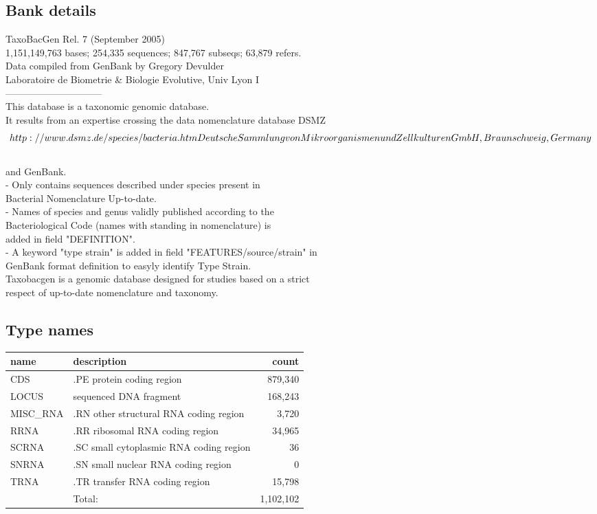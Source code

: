 \documentclass{article}
\begin{document}
\begin{Schunk}
\subsection{Bank details}
TaxoBacGen Rel. 7 (September 2005)\\
1,151,149,763 bases; 254,335 sequences; 847,767 subseqs; 63,879 refers.\\
Data compiled from GenBank by Gregory Devulder\\
Laboratoire de Biometrie \& Biologie Evolutive, Univ Lyon I\\
------------------------------\\
This database is a taxonomic genomic database.\\
It results from an expertise crossing the data nomenclature database DSMZ\\
\[http://www.dsmz.de/species/bacteria.htm Deutsche Sammlung von\\
Mikroorganismen und Zellkulturen GmbH, Braunschweig, Germany\]\\
and GenBank.\\
- Only contains sequences described under species present in\\
Bacterial Nomenclature Up-to-date.\\
- Names of species and genus validly published according to the\\
Bacteriological Code (names with standing in nomenclature) is\\
added in field "DEFINITION".\\
- A keyword "type strain" is added in field "FEATURES/source/strain" in\\
GenBank format definition to easyly identify Type Strain.\\
Taxobacgen is a genomic database designed for studies based on a strict\\
respect of up-to-date nomenclature and taxonomy.

\subsection{Type names}
\noindent\begin{tabular}{llr}
\hline \hline
name & description & count \\
\hline
CDS  &  .PE protein coding region  &  879,340 \\
LOCUS  &  sequenced DNA fragment  &  168,243 \\
MISC\_RNA  &  .RN other structural RNA coding region  &  3,720 \\
RRNA  &  .RR ribosomal RNA coding region  &  34,965 \\
SCRNA  &  .SC small cytoplasmic RNA coding region  &  36 \\
SNRNA  &  .SN small nuclear RNA coding region  &  0 \\
TRNA  &  .TR transfer RNA coding region  &  15,798 \\
\hline
 & Total: & 1,102,102 \\
\hline \hline
\end{tabular}


\end{Schunk}
\end{document}
